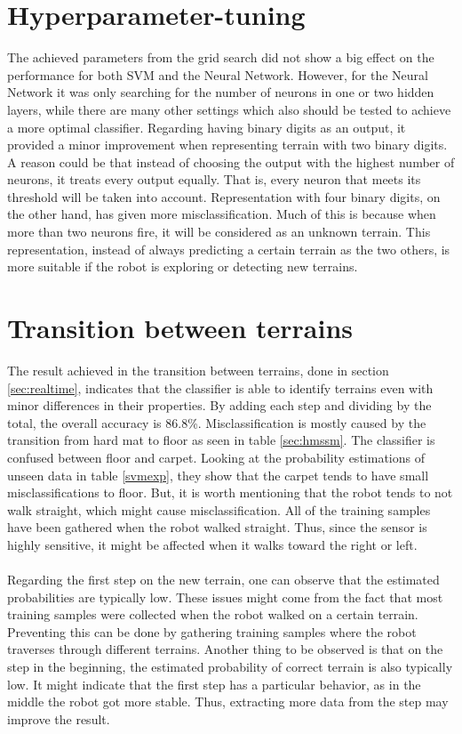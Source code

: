 \documentclass[USenglish]{ifimaster}  %
\begin{document}
\section{Hyperparameter-tuning}
The achieved parameters from the grid search did not show a big effect on the performance for both SVM and the Neural Network. However, for the Neural Network it was only searching for the number of neurons in one or two hidden layers, while there are many other settings which also should be tested to achieve a more optimal classifier. Regarding having binary digits as an output, it provided a minor improvement when representing terrain with two binary digits. A reason could be that instead of choosing the output with the highest number of neurons, it treats every output equally. That is, every neuron that meets its threshold will be taken into account. Representation with four binary digits, on the other hand, has given more misclassification. Much of this is because when more than two neurons fire, it will be considered as an unknown terrain. This representation, instead of always predicting a certain terrain as the two others, is more suitable if the robot is exploring or detecting new terrains.

\section{Transition between terrains}
The result achieved in the transition between terrains, done in section \ref{sec:realtime}, indicates that the classifier is able to identify terrains even with minor differences in their properties. By adding each step and dividing by the total, the overall accuracy is 86.8\%. Misclassification is mostly caused by the transition from hard mat to floor as seen in table \ref{sec:hmssm}. The classifier is confused between floor and carpet. Looking at the probability estimations of unseen data in table \ref{svmexp}, they show that the carpet tends to have small misclassifications to floor. But, it is worth mentioning that the robot tends to not walk straight, which might cause misclassification. All of the training samples have been gathered when the robot walked straight. Thus, since the sensor is highly sensitive, it might be affected when it walks toward the right or left.
\\
\\
Regarding the first step on the new terrain, one can observe that the estimated probabilities are typically low. These issues might come from the fact that most training samples were collected when the robot walked on a certain terrain. Preventing this can be done by gathering training samples where the robot traverses through different terrains. Another thing to be observed is that on the step in the beginning, the estimated probability of correct terrain is also typically low. It might indicate that the first step has a particular behavior, as in the middle the robot got more stable. Thus, extracting more data from the step may improve the result.  
	
\end{document}
